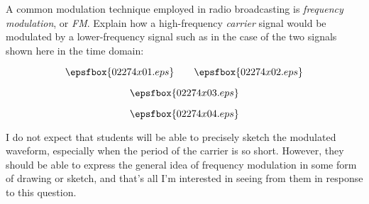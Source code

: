 

A common modulation technique employed in radio broadcasting is {\it frequency modulation}, or {\it FM}.  Explain how a high-frequency {\it carrier} signal would be modulated by a lower-frequency signal such as in the case of the two signals shown here in the time domain:

$$\epsfbox{02274x01.eps} \hbox{\hskip 20pt} \epsfbox{02274x02.eps}$$

$$\epsfbox{02274x03.eps}$$







$$\epsfbox{02274x04.eps}$$







I do not expect that students will be able to precisely sketch the modulated waveform, especially when the period of the carrier is so short.  However, they should be able to express the general idea of frequency modulation in some form of drawing or sketch, and that's all I'm interested in seeing from them in response to this question.




